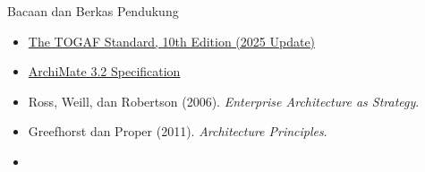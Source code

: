\documentclass[aspectratio=169, table, 12pt]{beamer}
\begin{document}
\begin{frame}{{\Large Bacaan dan Berkas Pendukung}}
  \vspace{10pt}
  \begin{itemize}
    \item \href{https://www.opengroup.org/togaf}{The TOGAF Standard, 10th Edition (2025 Update)}
    \item \href{https://publications.opengroup.org/standards/archimate/c226}{ArchiMate 3.2 Specification}
    \item Ross, Weill, dan Robertson (2006). \textit{Enterprise Architecture as Strategy}.
    \item Greefhorst dan Proper (2011). \textit{Architecture Principles}.
    \item {}
  \end{itemize}
\end{frame}
\end{document}
